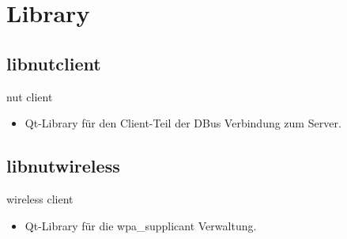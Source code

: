 
\section{Library}
\subsection{libnutclient}
\begin{frame}[<+-| alert@+>]{nut client}
	\begin{itemize}
		\item Qt-Library für den Client-Teil der DBus Verbindung zum Server.
	\end{itemize}
\end{frame}

\subsection{libnutwireless}
\begin{frame}[<+-| alert@+>]{wireless client}
	\begin{itemize}
		\item Qt-Library für die wpa\_supplicant Verwaltung.
	\end{itemize}
\end{frame}
